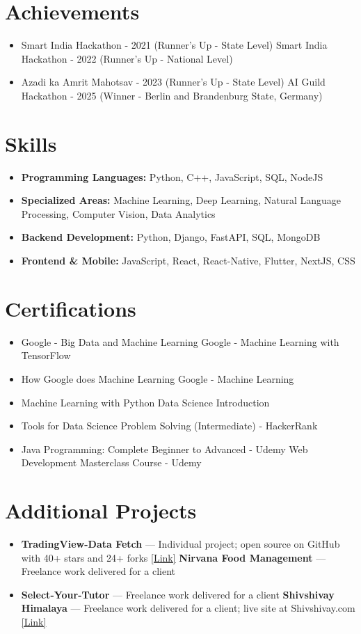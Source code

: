 \documentclass[a4paper,10pt]{article}
\begin{document}
\section*{Achievements}
\begin{itemize}
\item Smart India Hackathon - 2021 (Runner's Up - State Level) \hfill Smart India Hackathon - 2022 (Runner's Up - National Level)
\item Azadi ka Amrit Mahotsav - 2023 (Runner's Up - State Level) \hfill AI Guild Hackathon - 2025 (Winner - Berlin and Brandenburg State, Germany)
\end{itemize}

\section*{Skills}
\begin{itemize}
  \item \textbf{Programming Languages:} Python, C++, JavaScript, SQL, NodeJS
  \item \textbf{Specialized Areas:} Machine Learning, Deep Learning, Natural Language Processing, Computer Vision, Data Analytics
  \item \textbf{Backend Development:} Python, Django, FastAPI, SQL, MongoDB
  \item \textbf{Frontend \& Mobile:} JavaScript, React, React-Native, Flutter, NextJS, CSS
\end{itemize}

\section*{Certifications}
\begin{itemize}
\item Google - Big Data and Machine Learning \hfill Google - Machine Learning with TensorFlow
\item How Google does Machine Learning \hfill Google - Machine Learning
\item Machine Learning with Python \hfill Data Science Introduction
\item Tools for Data Science \hfill Problem Solving (Intermediate) - HackerRank
\item Java Programming: Complete Beginner to Advanced - Udemy \hfill Web Development Masterclass Course - Udemy
\end{itemize}

\section*{Additional Projects}
\begin{itemize}
\item \textbf{TradingView-Data Fetch} — Individual project; open source on GitHub with 40+ stars and 24+ forks \href{https://github.com/ravalmeet/TradingView}{[Link]} \hfill \textbf{Nirvana Food Management} — Freelance work delivered for a client
\item \textbf{Select-Your-Tutor} — Freelance work delivered for a client \hfill \textbf{Shivshivay Himalaya} — Freelance work delivered for a client; live site at Shivshivay.com \href{Shivshivay.com}{[Link]}
\end{itemize}
\end{document}

